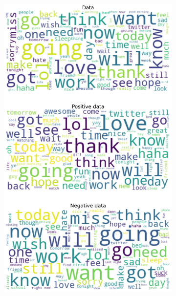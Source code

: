 \documentclass{article}
\begin{document}
\begin{itemize}
\begin{figure}[H]
\begin{subfigure}[b]{0.24\textwidth}
      \includegraphics[width=\textwidth]{chapter-06/section-01-01/09/visualization/2/wordcloud.png}
    \end{subfigure}
    \begin{subfigure}[b]{0.24\textwidth}
      \centering

\end{subfigure}
\end{figure}
\end{itemize}
\end{document}
